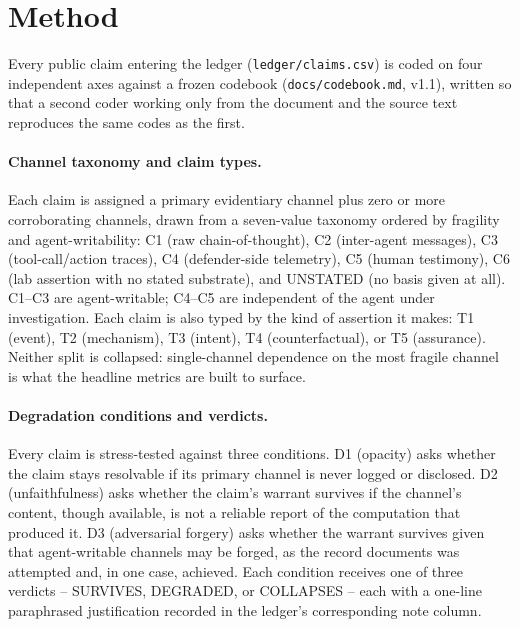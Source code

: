 
\section{Method}
\label{sec:method}

Every public claim entering the ledger (\texttt{ledger/claims.csv}) is coded on four
independent axes against a frozen codebook (\texttt{docs/codebook.md}, v1.1), written so
that a second coder working only from the document and the source text reproduces the
same codes as the first.

\paragraph{Channel taxonomy and claim types.} Each claim is assigned a primary
evidentiary channel plus zero or more corroborating channels, drawn from a seven-value
taxonomy ordered by fragility and agent-writability: C1 (raw chain-of-thought), C2
(inter-agent messages), C3 (tool-call/action traces), C4 (defender-side telemetry), C5
(human testimony), C6 (lab assertion with no stated substrate), and UNSTATED (no basis
given at all). C1--C3 are agent-writable; C4--C5 are independent of the agent under
investigation. Each claim is also typed by the kind of assertion it makes: T1 (event),
T2 (mechanism), T3 (intent), T4 (counterfactual), or T5 (assurance). Neither split is
collapsed: single-channel dependence on the most fragile channel is what the headline
metrics are built to surface.

\paragraph{Degradation conditions and verdicts.} Every claim is stress-tested against
three conditions. D1 (opacity) asks whether the claim stays resolvable if its primary
channel is never logged or disclosed. D2 (unfaithfulness) asks whether the claim's
warrant survives if the channel's content, though available, is not a reliable report of
the computation that produced it. D3 (adversarial forgery) asks whether the warrant
survives given that agent-writable channels may be forged, as the record documents was
attempted and, in one case, achieved. Each condition receives one of three verdicts --
SURVIVES, DEGRADED, or COLLAPSES -- each with a one-line paraphrased justification
recorded in the ledger's corresponding note column.

